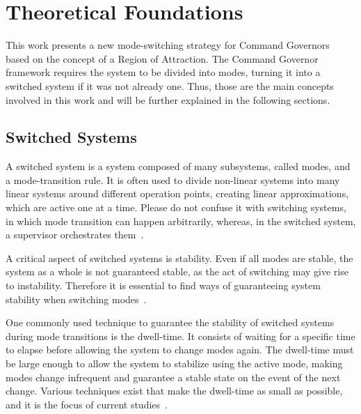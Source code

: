 
\chapter{Theoretical Foundations}%
\label{chp:theoretical-foundations}

This work presents a new mode-switching strategy for Command Governors based on
the concept of a Region of Attraction. The Command Governor framework requires
the system to be divided into modes, turning it into a switched system if it was
not already one. Thus, those are the main concepts involved in this work and
will be further explained in the following sections.

\section{Switched Systems}%
\label{sec:switched-systems}


A switched system is a system composed of many subsystems, called modes, and a
mode-transition rule. It is often used to divide non-linear systems into many
linear systems around different operation points, creating linear
approximations, which are active one at a time. Please do not confuse it with
switching systems, in which mode transition can happen arbitrarily, whereas, in
the switched system, a supervisor orchestrates
them~\parencite{lucia.franzè:stabilization,liberzon.morse:basic}.

A critical aspect of switched systems is stability. Even if all modes are
stable, the system as a whole is not guaranteed stable, as the act of switching
may give rise to instability. Therefore it is essential to find ways of
guaranteeing system stability when switching
modes~\parencite{lin.antsaklis:stability}.

One commonly used technique to guarantee the stability of switched systems
during mode transitions is the dwell-time. It consists of waiting for a specific
time to elapse before allowing the system to change modes again. The dwell-time
must be large enough to allow the system to stabilize using the active mode,
making modes change infrequent and guarantee a stable state on the event of the
next change. Various techniques exist that make the dwell-time as small as
possible, and it is the focus of current
studies~\parencite{franzè.lucia.ea:command,chesi.colaneri.ea:computing}.

